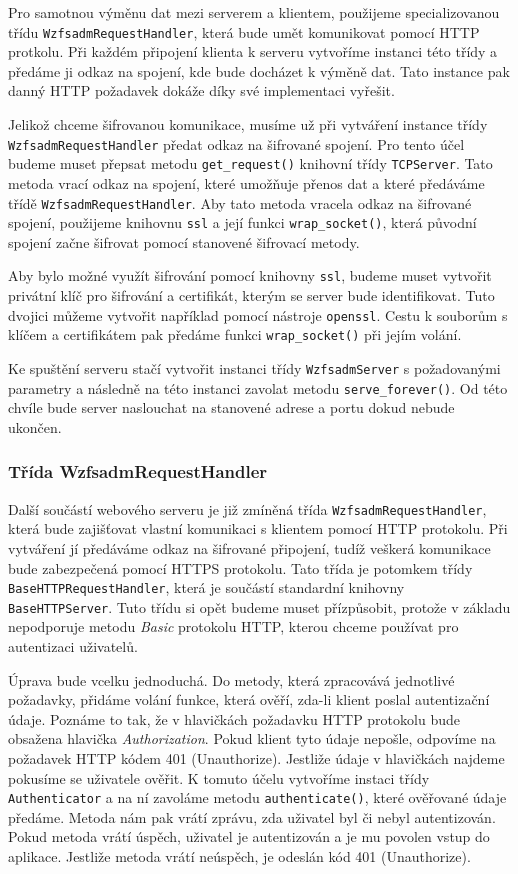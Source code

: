     Pro samotnou výměnu dat mezi serverem a klientem, použijeme specializovanou třídu \verb|WzfsadmRequestHandler|, která bude umět komunikovat pomocí HTTP protkolu. Při každém připojení klienta k serveru vytvoříme instanci této třídy a předáme ji odkaz na spojení, kde bude docházet k výměně dat. Tato instance pak danný HTTP požadavek dokáže díky své implementaci vyřešit.

    Jelikož chceme šifrovanou komunikace, musíme už při vytváření instance třídy \verb|WzfsadmRequestHandler| předat odkaz na šifrované spojení. Pro tento účel budeme muset přepsat metodu \verb|get_request()| knihovní třídy \verb|TCPServer|. Tato metoda vrací odkaz na spojení, které umožňuje přenos dat a které předáváme třídě \verb|WzfsadmRequestHandler|. Aby tato metoda vracela odkaz na šifrované spojení, použijeme knihovnu \verb|ssl| a její funkci \verb|wrap_socket()|, která původní spojení začne šifrovat pomocí stanovené šifrovací metody.

    Aby bylo možné využít šifrování pomocí knihovny \verb|ssl|, budeme muset vytvořit privátní klíč pro šifrování a certifikát, kterým se server bude identifikovat. Tuto dvojici můžeme vytvořit například pomocí nástroje \verb|openssl|. Cestu k souborům s klíčem a certifikátem pak předáme funkci \verb|wrap_socket()| při jejím volání.

    Ke spuštění serveru stačí vytvořit instanci třídy \verb|WzfsadmServer| s požadovanými parametry a následně na této instanci zavolat metodu \verb|serve_forever()|. Od této chvíle bude server naslouchat na stanovené adrese a portu dokud nebude ukončen.


    \subsubsection{Třída WzfsadmRequestHandler}
    Další součástí webového serveru je již zmíněná třída \verb|WzfsadmRequestHandler|, která bude zajišťovat vlastní komunikaci s klientem pomocí HTTP protokolu. Při vytváření jí předáváme odkaz na šifrované připojení, tudíž veškerá komunikace bude zabezpečená pomocí HTTPS protokolu. Tato třída je potomkem třídy \verb|BaseHTTPRequestHandler|, která je součástí standardní knihovny \verb|BaseHTTPServer|. Tuto třídu si opět budeme muset přízpůsobit, protože v základu nepodporuje metodu \emph{Basic} protokolu HTTP, kterou chceme používat pro autentizaci uživatelů.

    Úprava bude vcelku jednoduchá. Do metody, která zpracovává jednotlivé požadavky, přidáme volání funkce, která ověří, zda-li klient poslal autentizační údaje. Poznáme to tak, že v hlavičkách požadavku HTTP protokolu bude obsažena hlavička \emph{Authorization}. Pokud klient tyto údaje nepošle, odpovíme na požadavek HTTP kódem 401 (Unauthorize). Jestliže údaje v hlavičkách najdeme pokusíme se uživatele ověřit. K tomuto účelu vytvoříme instaci třídy \verb|Authenticator| a na ní zavoláme metodu \verb|authenticate()|, které ověřované údaje předáme. Metoda nám pak vrátí zprávu, zda uživatel  byl či nebyl autentizován. Pokud metoda vrátí úspěch, uživatel je autentizován a je mu povolen vstup do aplikace. Jestliže metoda vrátí neúspěch, je odeslán kód 401 (Unauthorize).


